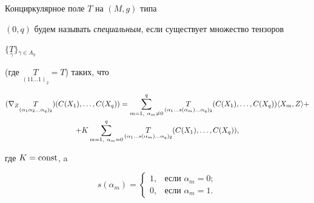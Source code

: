 \begin{defn} Конциркулярное поле $T$ на $(M, g)$ типа 


$(0,q)$ будем называть {\it специальным}, если существует множество тензоров 


$\{\underset{\gamma}{T}{}\} {}_{\gamma \in A_{q}}$ 


(где $\underset{ (11\dotsc1)_{2}}{T}{} = T$) таких, что


\begin{multline}


(\nabla_{Z} \underset{ (\alpha_{1}\alpha_{2} \dotsc \alpha_{q})_{2}}


{T}{}) (C(X_{1}), \dotsc, C(X_{q})) =


\sum_{m=1,\ \alpha_{m} \ne 0}^q


\underset{(\alpha_{1}\dotsc s(\alpha_{m})\dotsc


\alpha_{q})_{2}}{T}{} (C(X_{1}), \dotsc, C(X_{q}))\la X_{m},Z\ra + \\ 


%


+K\sum_{m=1,\ \alpha_{m}= 0}^q


\underset {(\alpha_{1} \dotsc s(\alpha_{m}) \dotsc


\alpha_{q})_{2}} {T}{} (C(X_{1}), \dotsc, C(X_{q})),


\end{multline}


где $K =\operatorname{const}$, a


$$


s(\alpha_{m}) = \begin{cases}


1, & \text{если } \alpha_{m} = 0; \\ 0, 


& \text{если } \alpha_{m }=1.


\end{cases}


$$


\end{defn}





